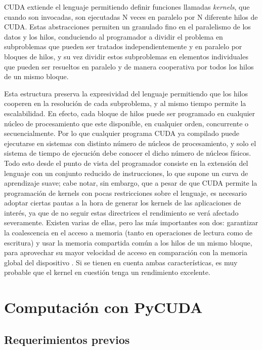 \documentclass[twocolumn,twoside]{Jornadas}
\begin{document}
CUDA extiende el lenguaje permitiendo definir funciones llamadas \emph{kernels}, que cuando son invocadas, son ejecutadas N veces en paralelo por N diferente hilos de CUDA. Estas abstracciones permiten un granulado fino en el paralelismo de los datos y los hilos, conduciendo al programador a dividir el problema en subproblemas que pueden ser tratados independientemente y en paralelo por bloques de hilos, y su vez dividir estos subproblemas en elementos individuales que pueden ser resueltos en paralelo y de manera cooperativa por todos los hilos de un mismo bloque.

\vspace{5 mm}

Esta estructura preserva la expresividad del lenguaje permitiendo que los hilos cooperen en la resolución de cada subproblema, y al mismo tiempo permite la escalabilidad. En efecto, cada bloque de hilos puede ser programado en cualquier núcleo de procesamiento que este disponible, en cualquier orden, concurrente o secuencialmente. Por lo que cualquier programa CUDA ya compilado puede ejecutarse en sistemas con distinto número de núcleos de procesamiento, y solo el sistema de tiempo de ejecución debe conocer el dicho número de núcleos físicos. Todo esto desde el punto de vista del programador consiste en la extensión del lenguaje con un conjunto reducido de instrucciones, lo que supone un curva de aprendizaje suave; cabe notar, sin embargo, que a pesar de que CUDA permite la programación de kernels con pocas restricciones sobre el lenguaje, es necesario adoptar ciertas pautas a la hora de generar los kernels de las aplicaciones de interés, ya que de no seguir estas directrices el rendimiento se verá afectado severamente. Existen varias de ellas, pero las más importantes son dos: garantizar la coalescencia en el acceso a memoria (tanto en operaciones de lectura como de escritura) y usar la memoria compartida común a los hilos de un mismo bloque, para aprovechar su mayor velocidad de acceso en comparación con la memoria global del dispositivo \cite{cbestpractices}. Si se tienen en cuenta ambas características, es muy probable que el kernel en cuestión tenga un rendimiento excelente.

\section{Computación con PyCUDA}

\subsection{Requerimientos previos}
\end{document}
